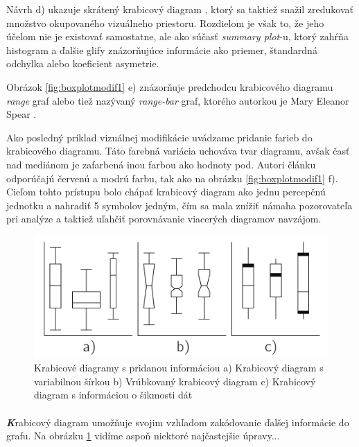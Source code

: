 Návrh d) ukazuje skrátený krabicový diagram \cite{VisualSummaryPotter}, ktorý sa taktiež snažil zredukovať množstvo okupovaného vizuálneho priestoru. Rozdielom je však to, že jeho účelom nie je existovať samostatne, ale ako súčasť \textit{summary plot}-u, ktorý zahŕňa histogram a ďalšie glify znázorňujúce informácie ako priemer, štandardná odchylka alebo koeficient asymetrie.

Obrázok \ref{fig:boxplotmodif1} e) znázorňuje predchodcu krabicového diagramu \textit{range} graf alebo tiež nazývaný \textit{range-bar} graf, ktorého autorkou je Mary Eleanor Spear \cite{Spear}.

Ako posledný príklad vizuálnej modifikácie uvádzame pridanie farieb do krabicového diagramu. Táto farebná variácia uchováva tvar diagramu, avšak časť nad mediánom je zafarbená inou farbou ako hodnoty pod. Autori článku odporúčajú červenú a modrú farbu, tak ako na obrázku \ref{fig:boxplotmodif1} f). Cieľom tohto prístupu bolo chápať krabicový diagram ako jednu percepčnú jednotku a nahradiť 5 symbolov jedným, čím sa mala znížiť námaha pozorovateľa pri analýze a taktiež uľahčiť porovnávanie viacerých diagramov navzájom. 


\begin{figure}
	\centering
	\includegraphics[width = 6in]{boxplot3}
	\caption{Krabicové diagramy s pridanou informáciou a) Krabicový diagram s variabilnou šírkou \cite{McGill} b) Vrúbkovaný krabicový diagram \cite{McGill} c) Krabicový diagram s informáciou o šikmosti dát \cite{Chamnein}}
	\label{fig:boxplotmodif2}
\end{figure}


\paragraph{}
{\large \textbf{\textit{K}}}rabicový diagram umožňuje svojim vzhľadom zakódovanie ďalšej informácie do grafu. Na obrázku \ref{fig:boxplotmodif2} vidíme aspoň niektoré najčastejšie úpravy... %

